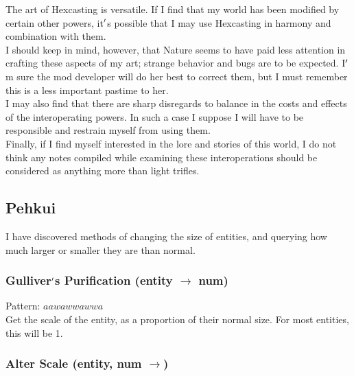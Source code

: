 \documentclass[12pt]{article}
\begin{document}
  
    The art of Hexcasting is versatile. If I find that my world has been modified by certain other powers, it$\rq$s possible that I may use Hexcasting in harmony and combination with them.\\


  
    I should keep in mind, however, that Nature seems to have paid less attention in crafting these aspects of my art; strange behavior and bugs are to be expected. I$\rq$m sure the mod developer will do her best to correct them, but I must remember this is a less important pastime to her.\\I may also find that there are sharp disregards to balance in the costs and effects of the interoperating powers. In such a case I suppose I will have to be responsible and restrain myself from using them.\\


  
    Finally, if I find myself interested in the lore and stories of this world, I do not think any notes compiled while examining these interoperations should be considered as anything more than light trifles.\\

\newpage

\label{sec:interop/pehkui}
\subsection*{Pehkui}


  
    I have discovered methods of changing the size of entities, and querying how much larger or smaller they are than normal.\\


  \label{sec: interop/pehkui@hexcasting:interop/pehkui/get}
\subsubsection*{Gulliver$\rq$s Purification (entity $\rightarrow$ num)}

    Pattern: $aawawwawwa$\\
      Get the scale of the entity, as a proportion of their normal size. For most entities, this will be 1.\\


  \label{sec: interop/pehkui@hexcasting:interop/pehkui/set}
\subsubsection*{Alter Scale (entity, num $\rightarrow$)}
\end{document}
